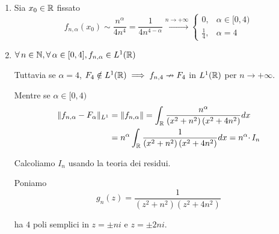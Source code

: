 \Soluzione
\begin{enumerate}
\item Sia $x_{0} \in \RR $ fissato\begin{equation*}
f_{n,\alpha }( x_{0}) \sim \frac{n^{\alpha }}{4n^{4}} =\frac{1}{4n^{4-\alpha }}\xrightarrow{n\rightarrow +\infty }\begin{cases}
0, & \alpha \in [ 0,4)\\
\frac{1}{4} , & \alpha =4
\end{cases}
\end{equation*}
\item $\forall n\in \NN  ,\forall \alpha \in [ 0,4] ,f_{n,\alpha } \in L^{1}(\RR )$

Tuttavia se $\alpha =4$, $F_{4} \notin L^{1}(\RR ) \implies f_{n,4} \nrightarrow F_{4}$ in $L^{1}(\RR )$ per $n\rightarrow +\infty $.

Mentre se $\alpha \in [ 0,4)$\begin{equation*}
\begin{aligned}
\Vert f_{n,\alpha } -F_{\alpha }\Vert _{L^{1}} & =\Vert f_{n,\alpha }\Vert =\int _{\RR }\frac{n^{\alpha }}{\left( x^{2} +n^{2}\right)\left( x^{2} +4n^{2}\right)} dx\\
 & =n^{\alpha }\int _{\RR }\frac{1}{\left( x^{2} +n^{2}\right)\left( x^{2} +4n^{2}\right)} dx=n^{\alpha } \cdotp I_{n}
\end{aligned}
\end{equation*}

Calcoliamo $I_{n}$ usando la teoria dei residui.

Poniamo\begin{equation*}
g_{n}( z) =\frac{1}{\left( z^{2} +n^{2}\right)\left( z^{2} +4n^{2}\right)}
\end{equation*}

ha $4$ poli semplici in $z=\pm ni$ e $z=\pm 2ni$.

\begin{figure}[htpb]
	\centering
{} %

\begin{tikzpicture}[x=0.75pt,y=0.75pt,yscale=-1,xscale=1]


\end{tikzpicture}
\end{figure}
\end{enumerate}
